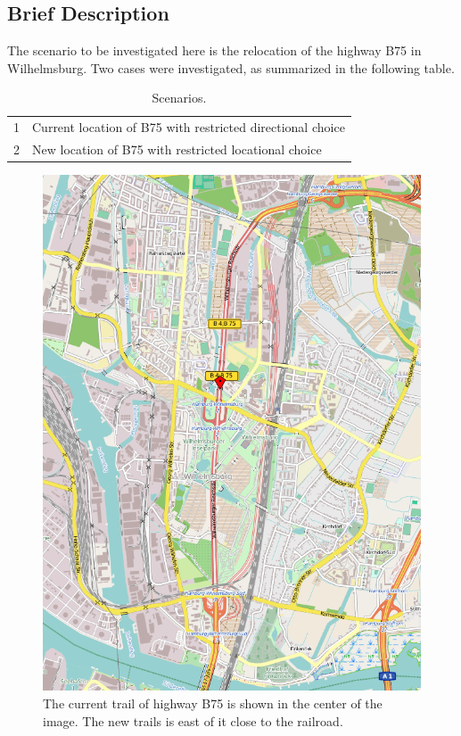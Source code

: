 
%

\subsection{Brief Description}

The scenario to be investigated here is the relocation of the highway B75 in Wilhelmsburg. 
Two cases were investigated, as summarized in the following table.

\begin{table}[!ht]
\caption{Scenarios.}
\label{table:b75scenarios}
\begin{tabular}{|l | l|}
\hline
1 & Current location of B75 with restricted directional choice\\
2 & New location of B75 with restricted locational choice\\
\hline
\end{tabular}
\end{table}

\begin{figure}[!ht]
	\centering
	\includegraphics[width=0.7\linewidth]{extending/figures/Evacuation/B75overview}
	\caption[New and old section of B75]{The current trail of highway B75 is shown in the center of the image. The new trails is east of it close to the railroad.}
	\label{fig:overviewB75}
\end{figure}

